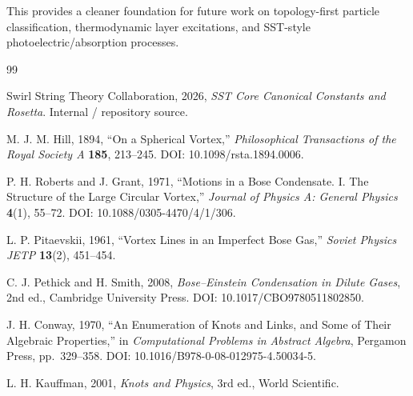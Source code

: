 \documentclass[11pt]{article}
\begin{document}
    This provides a cleaner foundation for future work on topology-first particle classification, thermodynamic layer excitations, and SST-style photoelectric/absorption processes.
    
    \begin{thebibliography}{99}
        
        Swirl String Theory Collaboration, 2026,
        \textit{SST Core Canonical Constants and Rosetta}.
        Internal / repository source.
        
        M. J. M. Hill, 1894,
        ``On a Spherical Vortex,''
        \textit{Philosophical Transactions of the Royal Society A} \textbf{185}, 213--245.
        DOI: 10.1098/rsta.1894.0006.
        
        P. H. Roberts and J. Grant, 1971,
        ``Motions in a Bose Condensate. I. The Structure of the Large Circular Vortex,''
        \textit{Journal of Physics A: General Physics} \textbf{4}(1), 55--72.
        DOI: 10.1088/0305-4470/4/1/306.
        
        L. P. Pitaevskii, 1961,
        ``Vortex Lines in an Imperfect Bose Gas,''
        \textit{Soviet Physics JETP} \textbf{13}(2), 451--454.
        
        C. J. Pethick and H. Smith, 2008,
        \textit{Bose--Einstein Condensation in Dilute Gases}, 2nd ed.,
        Cambridge University Press.
        DOI: 10.1017/CBO9780511802850.
        
        J. H. Conway, 1970,
        ``An Enumeration of Knots and Links, and Some of Their Algebraic Properties,''
        in \textit{Computational Problems in Abstract Algebra},
        Pergamon Press, pp.~329--358.
        DOI: 10.1016/B978-0-08-012975-4.50034-5.
        
        L. H. Kauffman, 2001,
        \textit{Knots and Physics}, 3rd ed.,
        World Scientific.
    
    \end{thebibliography}
\end{document}
